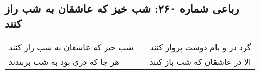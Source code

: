 \begin{center}
\section*{رباعی شماره ۲۶۰: شب خیز که عاشقان به شب راز کنند}
\label{sec:sh260}
\begin{longtable}{l p{0.5cm} r}
شب خیز که عاشقان به شب راز کنند
&&
گرد در و بام دوست پرواز کنند
\\
هر جا که دری بود به شب بربندند
&&
الا در عاشقان که شب باز کنند
\\
\end{longtable}
\end{center}
